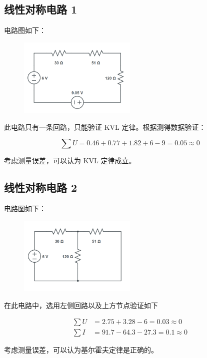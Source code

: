 \documentclass[a4paper,utf8]{article}
\begin{document}
    \subsection{线性对称电路 1}
        电路图如下： \par
        \begin{figure}[!ht]
            \includegraphics[width=0.5\textwidth]{cir1.png}
        \end{figure}\par
        此电路只有一条回路，只能验证 KVL 定律。根据测得数据验证：\par
        \begin{equation*}
            \sum U= 0.46+0.77+1.82+6-9=0.05\approx 0
        \end{equation*}\par
        考虑测量误差，可以认为 KVL 定律成立。

    \subsection{线性对称电路 2}
        电路图如下： \par
        \begin{figure}[!ht]
            \includegraphics[width=0.5\textwidth]{cir2.png}
        \end{figure}\par
        在此电路中，选用左侧回路以及上方节点验证如下\par
        \begin{align*}
            \sum U&= 2.75+3.28-6=0.03\approx 0\\
            \sum I&= 91.7-64.3-27.3=0.1\approx 0
        \end{align*}\par
        考虑测量误差，可以认为基尔霍夫定律是正确的。
\end{document}
